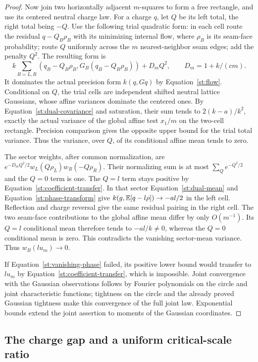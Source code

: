 \begin{proof}
Now join two horizontally adjacent $m$-squares to form a free rectangle,
and use its centered neutral charge law. For a charge $q$, let $Q$ be its
left total, the right total being $-Q$. Use the following trial quadratic
form: in each cell route the residual $q-Q_B\rho_B$ with its minimizing
internal flow, where $\rho_B$ is its seam-face probability; route $Q$
uniformly across the $m$ nearest-neighbor seam edges; add the penalty $Q^2$.
The resulting form is
\[
 k\sum_{B=L,R}(q_B-Q_B\rho_B,G_B(q_B-Q_B\rho_B))+D_mQ^2,
 \qquad D_m=1+k/(cm).
\]
It dominates the actual precision form $k(q,Gq)$ by
Equation~\eqref{st:flow}. Conditional on $Q$, the trial cells are independent
shifted neutral lattice Gaussians, whose affine variances dominate the
centered ones. By Equation~\eqref{st:dual-covariance} and saturation, their
sum tends to $2(k-a)/k^2$, exactly the actual variance of the global affine
test $x_1/m$ on the two-cell rectangle. Precision comparison gives the
opposite upper bound for the trial total variance. Thus the variance,
over $Q$, of its conditional affine mean tends to zero.

The sector weights, after common normalization, are
$e^{-D_mQ^2/2}w_L(Q\rho_L)w_R(-Q\rho_R)$.
Their normalizing sum is at most $\sum_Q e^{-Q^2/2}$ and the $Q=0$ term is
one. The $Q=l$ term stays positive by Equation~\eqref{st:coefficient-transfer}.
In that sector Equation~\eqref{st:dual-mean} and
Equation~\eqref{st:phase-transform} give
$k(g,\mathbb E[q-l\rho])\to-al/2$ in the left cell. Reflection and charge
reversal give the same residual pairing in the right cell. The two
seam-face contributions to the global affine mean differ by only
$O(m^{-1})$. Its $Q=l$ conditional mean therefore tends to $-al/k\ne0$,
whereas the $Q=0$ conditional mean is zero. This contradicts the vanishing
sector-mean variance. Thus $w_B(lu_m)\to0$.

If Equation~\eqref{st:vanishing-phase} failed, its positive lower bound
would transfer to $lu_m$ by Equation~\eqref{st:coefficient-transfer}, which
is impossible. Joint convergence with the Gaussian observations follows
by Fourier polynomials on the circle and joint characteristic functions;
tightness on the circle and the already proved Gaussian tightness make
this convergence of the full joint law. Exponential bounds extend the
joint assertion to moments of the Gaussian coordinates.
\end{proof}

\subsection{The charge gap and a uniform critical-scale ratio}

